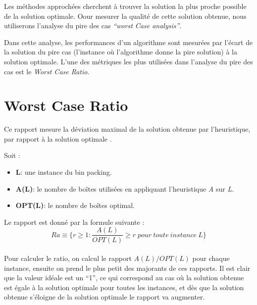 \documentclass[class=article, crop=false]{standalone}
\begin{document}
Les méthodes approchées cherchent à trouver la solution la plus proche possible de la solution optimale.
Oour mesurer la qualité de cette solution obtenue, nous utiliserons l’analyse du pire des cas \emph{“worst Case analysis”}.

Dans cette analyse, les performances d’un algorithme sont mesurées par l’écart de la solution du pire cas
(l’instance où l’algorithme donne la pire solution) à la solution optimale.
L’une des métriques les plus utilisées dans l’analyse du pire des cas est le \emph{Worst Case Ratio}.

\section*{Worst Case Ratio}
Ce rapport mesure la déviation maximal de la solution obtenue par l’heuristique, par rapport à la solution optimale \cite{anily1994worst}. 

Soit :
\begin{itemize}
    \item \textbf{L}: une instance du bin packing.
    \item \textbf{A(L)}: le nombre de boîtes utilisées en appliquant l’heuristique \emph{A} sur \emph{L}.
    \item \textbf{OPT(L)}: le nombre de boîtes optimal.
\end{itemize}
Le rapport est donné par la formule suivante :\\
\[ Ra\equiv \{r \geq 1 : \frac{A(L)}{OPT(L)} \geq r \; pour\: toute\: instance\: L\}\]\\
Pour calculer le ratio, on calcul le rapport  $A(L)/OPT(L)$  pour chaque instance, ensuite on prend le plus petit des majorants de ces rapports.
Il est clair que la valeur idéale est un “1”, ce qui correspond au cas où la solution obtenue est  égale à la solution optimale pour toutes les instances, et dès que la solution obtenue s’éloigne de la solution optimale le rapport va augmenter.
\end{document}
